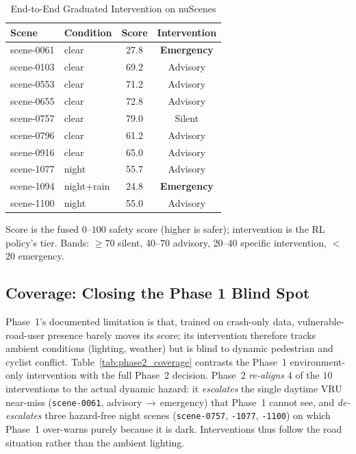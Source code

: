 \begin{table}[htbp]
\caption{End-to-End Graduated Intervention on nuScenes}
\label{tab:phase2_graduated}
\centering
\begin{tabular}{llcc}
\toprule
\textbf{Scene} & \textbf{Condition} & \textbf{Score} & \textbf{Intervention} \\
\midrule
scene-0061 & clear      & 27.8 & \textbf{Emergency} \\
scene-0103 & clear      & 69.2 & Advisory \\
scene-0553 & clear      & 71.2 & Advisory \\
scene-0655 & clear      & 72.8 & Advisory \\
scene-0757 & clear      & 79.0 & Silent \\
scene-0796 & clear      & 61.2 & Advisory \\
scene-0916 & clear      & 65.0 & Advisory \\
scene-1077 & night      & 55.7 & Advisory \\
scene-1094 & night+rain & 24.8 & \textbf{Emergency} \\
scene-1100 & night      & 55.0 & Advisory \\
\bottomrule
\end{tabular}
\vspace{2pt}
\footnotesize{Score is the fused $0$--$100$ safety score (higher is safer);
intervention is the RL policy's tier. Bands: $\geq$70 silent, 40--70 advisory,
20--40 specific intervention, $<$20 emergency.}
\end{table}

\subsection{Coverage: Closing the Phase 1 Blind Spot}
Phase~1's documented limitation is that, trained on crash-only data, vulnerable-
road-user presence barely moves its score; its intervention therefore tracks
ambient conditions (lighting, weather) but is blind to dynamic pedestrian and
cyclist conflict. Table~\ref{tab:phase2_coverage} contrasts the Phase~1
environment-only intervention with the full Phase~2 decision. Phase~2
\emph{re-aligns} $4$ of the $10$ interventions to the actual dynamic hazard: it
\emph{escalates} the single daytime VRU near-miss (\texttt{scene-0061},
advisory\,$\rightarrow$\,emergency) that Phase~1 cannot see, and \emph{de-escalates}
three hazard-free night scenes (\texttt{scene-0757}, \texttt{-1077}, \texttt{-1100})
on which Phase~1 over-warns purely because it is dark. Interventions thus follow
the road situation rather than the ambient lighting.

